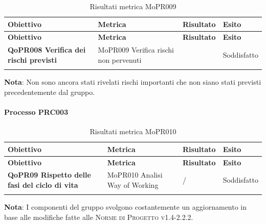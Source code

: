 \documentclass[../piano-di-qualifica.tex]{subfiles}
\begin{document}
\renewcommand{\arraystretch}{2} %
\begin{longtable}[H]{>{\centering\bfseries}m{5cm} >{\centering}m{5cm} >{\centering}m{2.5cm} >{\centering\arraybackslash}m{2.5cm}}  
  \rowcolor{lightgray}
  {\textbf{Obiettivo}} & {\textbf{Metrica}} & {\textbf{Risultato}} & {\textbf{Esito}}  \\
  \endfirsthead%
  \rowcolor{lightgray}
  {\textbf{Obiettivo}} & {\textbf{Metrica}} & {\textbf{Risultato}} & {\textbf{Esito}}  \\
  \endhead%
  \textbf{QoPR008 Verifica dei rischi previsti} & MoPR009 Verifica rischi non pervenuti & 0 & Soddisfatto \\
  \caption{Risultati metrica MoPR009}
  \label{tab:my-table}
\end{longtable}
\textbf{Nota}: Non sono ancora stati rivelati rischi importanti che non siano stati previsti precedentemente dal gruppo.

\paragraph{Processo PRC003}
\label{sub:processo_PRC003}

\renewcommand{\arraystretch}{2} %
\begin{longtable}[H]{>{\centering\bfseries}m{5cm} >{\centering}m{5cm} >{\centering}m{2.5cm} >{\centering\arraybackslash}m{2.5cm}}  
  \rowcolor{lightgray}
  {\textbf{Obiettivo}} & {\textbf{Metrica}} & {\textbf{Risultato}} & {\textbf{Esito}}  \\
  \endfirsthead%
  \rowcolor{lightgray}
  {\textbf{Obiettivo}} & {\textbf{Metrica}} & {\textbf{Risultato}} & {\textbf{Esito}}  \\
  \endhead%
  \textbf{QoPR09 Rispetto delle fasi del ciclo di vita} & MoPR010 Analisi Way of Working & / & Soddisfatto \\
  \caption{Risultati metrica MoPR010}
  \label{tab:my-table}
\end{longtable}
\textbf{Nota}: I componenti del gruppo svolgono costantemente un aggiornamento in base alle modifiche fatte alle \textsc{Norme di Progetto v1.4-2.2.2}.
\end{document}
